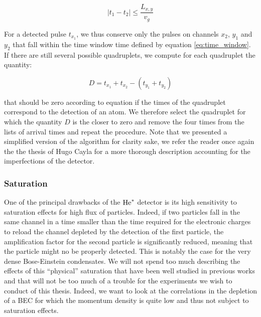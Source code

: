 \begin{equation}
    |t_1-t_2| \leq \frac{L_{x,y}}{v_g}
    \label{eq:time_window}
\end{equation}

\noindent For a detected pulse $t_{x_1}$, we thus conserve only the pulses on channels $x_2$, $y_1$ and $y_2$ that fall within the time window time defined by equation \ref{eq:time_window}. If there are still several possible quadruplets, we compute for each quadruplet the quantity:

\begin{equation}
    D = t_{x_1}+t_{x_2} - (t_{y_1}+t_{y_2})
\end{equation}

\noindent that should be zero according to equation \label{eq:tdet_MCP} if the times of the quadruplet correspond to the detection of an atom. We therefore select the quadruplet for which the quantity $D$ is the closer to zero and remove the four times from the lists of arrival times and repeat the procedure. Note that we presented a simplified version of the algorithm for clarity sake, we refer the reader once again the the thesis of Hugo Cayla \cite{cayla_these} for a more thorough description accounting for the imperfections of the detector.

\subsubsection{Saturation}

\label{sec:saturation_effect}

One of the principal drawbacks of the $\mathrm{He}^*$ detector is its high sensitivity to saturation effects for high flux of particles. Indeed, if two particles fall in the same channel in a time smaller than the time required for the electronic charges to reload the channel depleted by the detection of the first particle, the amplification factor for the second particle is significantly reduced, meaning that the particle might no be properly detected. This is notably the case for the very dense Bose-Einstein condensates. We will not spend too much describing the effects of this ``physical'' saturation that have been well studied in previous works \cite{carcy_these,cayla_these,edgar1992spatial,nogrette2015characterization} and that will not be too much of a trouble for the experiments we wish to conduct of this thesis. Indeed, we want to look at the correlations in the depletion of a BEC for which the momentum density is quite low and thus not subject to saturation effects.

